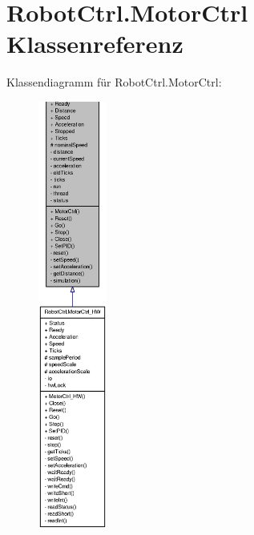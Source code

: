 \hypertarget{class_robot_ctrl_1_1_motor_ctrl}{
\section{RobotCtrl.MotorCtrl Klassenreferenz}
\label{class_robot_ctrl_1_1_motor_ctrl}
}


Klassendiagramm für RobotCtrl.MotorCtrl:\nopagebreak
\begin{figure}[H]
\begin{center}
\leavevmode
\includegraphics[height=400pt]{class_robot_ctrl_1_1_motor_ctrl__inherit__graph}
\end{center}
\end{figure}
